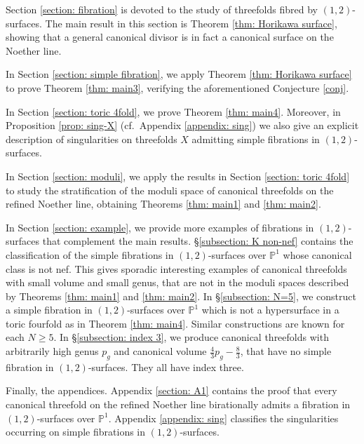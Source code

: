 \documentclass[a4paper,11pt]{amsart}
\newcommand{\PP}{\ensuremath{\mathbb{P}}}
\theoremstyle{definition}
\theoremstyle{remark}
\numberwithin{equation}{section}
\begin{document}
Section \ref{section: fibration} is devoted to the study of threefolds fibred by $(1, 2)$-surfaces. The main result in this section is Theorem \ref{thm: Horikawa surface}, showing that a general canonical divisor is in fact a canonical surface on the Noether line.

In Section \ref{section: simple fibration}, we apply Theorem \ref{thm: Horikawa surface} to prove Theorem \ref{thm: main3}, verifying the aforementioned Conjecture \ref{conj}.

In Section \ref{section: toric 4fold}, we prove Theorem \ref{thm: main4}. Moreover, in Proposition \ref{prop: sing-X} (cf.~Appendix \ref{appendix: sing}) we also give an explicit description of singularities on threefolds $X$ admitting simple fibrations in $(1, 2)$-surfaces. 

In Section \ref{section: moduli}, we apply the results in Section \ref{section: toric 4fold} to study the stratification of the moduli space of canonical threefolds on the refined Noether line, obtaining  Theorems \ref{thm: main1} and \ref{thm: main2}. 

In Section \ref{section: example}, we provide more examples of fibrations in $(1, 2)$-surfaces that complement the main results. \S \ref{subsection: K non-nef} contains the classification of the simple fibrations in $(1, 2)$-surfaces over $\PP^1$ whose canonical class is not nef. This gives sporadic interesting examples of canonical threefolds with small volume and small genus, that are not in the moduli spaces described by Theorems \ref{thm: main1} and \ref{thm: main2}. In \S \ref{subsection: N=5}, we construct a simple fibration in $(1, 2)$-surfaces over $\PP^1$ which is not a hypersurface in a toric fourfold as in Theorem \ref{thm: main4}. Similar constructions are known for each $N \ge 5$. In \S \ref{subsection: index 3}, we produce canonical threefolds with arbitrarily high genus $p_g$ and canonical volume $\frac43 p_g -\frac83$, that have no simple fibration in $(1, 2)$-surfaces. They all have index three.

Finally, the appendices. Appendix \ref{section: A1} contains the proof that every canonical threefold on the refined Noether line birationally admits a fibration in $(1, 2)$-surfaces over $\PP^1$. 
Appendix \ref{appendix: sing} classifies the singularities occurring on simple fibrations in $(1,2)$-surfaces.
\end{document}

